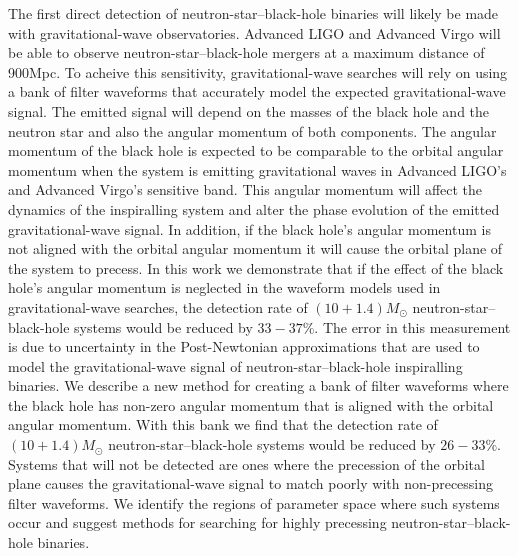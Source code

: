 The first direct detection of neutron-star--black-hole binaries will
likely be made with gravitational-wave observatories. Advanced LIGO and
Advanced Virgo will be able to observe neutron-star--black-hole mergers at a
maximum distance of 900Mpc. To acheive this sensitivity, gravitational-wave
searches will rely on using a bank of filter waveforms that
accurately model the expected gravitational-wave signal. The emitted signal
will depend on the masses of the black hole and the neutron star and also the
angular momentum of both components. The angular momentum
of the black hole is expected to be comparable to the orbital angular momentum
when the system is emitting gravitational waves in Advanced LIGO's and Advanced
Virgo's sensitive band.
This angular momentum will affect the dynamics of the inspiralling system and
alter the phase evolution of the emitted gravitational-wave signal. In
addition, if the black hole's angular momentum is not aligned with the orbital
angular momentum it will cause the orbital plane of the system to precess.
In this work we demonstrate that if the effect of the black
hole's angular momentum is neglected in the waveform models used in
gravitational-wave searches, the detection rate of $(10+1.4)M_{\odot}$
neutron-star--black-hole
systems would be reduced by $33 - 37\%$. The error in this measurement is due
to uncertainty in the Post-Newtonian approximations that are used to model the
gravitational-wave signal of neutron-star--black-hole inspiralling binaries. We
describe a new method for creating a bank of filter waveforms where the black
hole has non-zero angular momentum that is aligned with the orbital angular
momentum. With this bank we find that the detection rate of $(10+1.4)M_{\odot}$
neutron-star--black-hole systems would be reduced by $26-33\%$. Systems that
will not be detected are ones where the precession of the orbital plane causes
the gravitational-wave signal to match poorly with non-precessing filter
waveforms. We identify the regions of parameter space where such systems occur
and suggest methods for searching for highly precessing
neutron-star--black-hole binaries.

